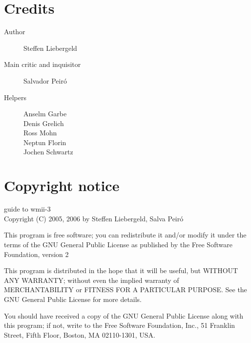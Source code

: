 \documentclass[12pt,a4paper]{article} %
\begin{document}
\newpage

\section{Credits}
\label{sec:credits}


\begin{description}
\item [Author] Steffen Liebergeld
\item [Main critic and inquisitor] Salvador Peir\'o

\item [Helpers]
Anselm Garbe \\
Denis Grelich \\
Ross Mohn \\
Neptun Florin \\
Jochen Schwartz \\
\end{description}

\section{Copyright notice}

guide to wmii-3\\
Copyright (C) 2005, 2006 by Steffen Liebergeld, Salva Peir\'o

This program is free software; you can redistribute it and/or modify
it under the terms of the GNU General Public License as published by
the Free Software Foundation, version 2

This program is distributed in the hope that it will be useful, but
WITHOUT ANY WARRANTY; without even the implied warranty of
MERCHANTABILITY or FITNESS FOR A PARTICULAR PURPOSE.  See the GNU
General Public License for more details.

You should have received a copy of the GNU General Public License
along with this program; if not, write to the Free Software
Foundation, Inc., 51 Franklin Street, Fifth Floor, Boston, MA
02110-1301, USA.
\end{document}
